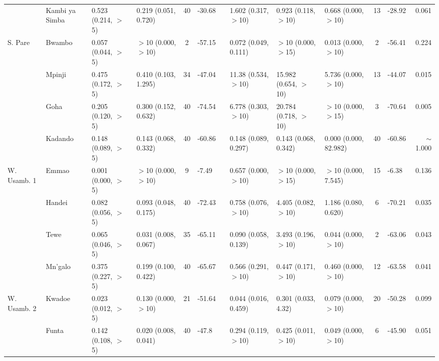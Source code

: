 \begin{tabular}{llllclllllclr}
            & Kambi ya Simba & 0.523 (0.214, $>$5)    & 0.219 (0.051, 0.720)   & 40   & -30.68   & & 1.602  (0.317, $>$10)   & 0.923  (0.118, $>$10)   & 0.668 (0.000, $>$10)   & 13  & -28.92   & 0.061\\
\cmidrule{2-13}
S. Pare     & Bwambo         & 0.057 (0.044, $>$5)    & $>$10 (0.000, $>$10)   & 2    & -57.15   & & 0.072  (0.049, 0.111)   & $>$10  (0.000, $>$15)   & 0.013 (0.000, $>$10)   & 2   & -56.41   & 0.224\\
            & Mpinji         & 0.475 (0.172, $>$5)    & 0.410 (0.103, 1.295)   & 34   & -47.04   & & 11.38  (0.534, $>$10)   & 15.982 (0.654, $>$10)   & 5.736 (0.000, $>$10)   & 13  & -44.07   & 0.015\\
            & Goha           & 0.205 (0.120, $>$5)    & 0.300 (0.152, 0.632)   & 40   & -74.54   & & 6.778  (0.303, $>$10)   & 20.784 (0.718, $>$10)   & $>$10 (0.000, $>$15)   & 3   & -70.64   & 0.005\\
            & Kadando        & 0.148 (0.089, $>$5)    & 0.143 (0.068, 0.332)   & 40   & -60.86   & & 0.148  (0.089, 0.297)   & 0.143  (0.068, 0.342)   & 0.000 (0.000, 82.982)  & 40  & -60.86   & $\sim$1.000\\
\cmidrule{2-13}
W. Usamb. 1 & Emmao          & 0.001 (0.000, $>$5)    & $>$10 (0.000, $>$10)   & 9    & -7.49    & & 0.657  (0.000, $>$10)   & $>$10  (0.000, $>$15)   & $>$10 (0.000, 7.545)   & 15  & -6.38    & 0.136\\
            & Handei         & 0.082 (0.056, $>$5)    & 0.093 (0.048, 0.175)   & 40   & -72.43   & & 0.758  (0.076, $>$10)   & 4.405  (0.082, $>$10)   & 1.186 (0.080, 0.620)   & 6   & -70.21   & 0.035\\
            & Tewe           & 0.065 (0.046, $>$5)    & 0.031 (0.008, 0.067)   & 35   & -65.11   & & 0.090  (0.058, 0.139)   & 3.493  (0.196, $>$10)   & 0.044 (0.000, $>$10)   & 2   & -63.06   & 0.043\\
            & Mn'galo        & 0.375 (0.227, $>$5)    & 0.199 (0.100, 0.422)   & 40   & -65.67   & & 0.566  (0.291, $>$10)   & 0.447  (0.171, $>$10)   & 0.460 (0.000, $>$10)   & 12  & -63.58   & 0.041\\
\cmidrule{2-13}
W. Usamb. 2 & Kwadoe         & 0.023 (0.012, $>$5)    & 0.130 (0.000, $>$10)   & 21   & -51.64   & & 0.044  (0.016, 0.459)   & 0.301  (0.033, 4.32)    & 0.079 (0.000, $>$10)   & 20  & -50.28   & 0.099\\
            & Funta          & 0.142 (0.108, $>$5)    & 0.020 (0.008, 0.041)   & 40   & -47.8    & & 0.294  (0.119, $>$10)   & 0.425  (0.011, $>$10)   & 0.049 (0.000, $>$10)   & 6   & -45.90   & 0.051\\

\end{tabular}
